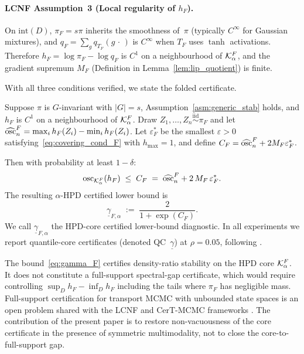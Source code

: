 \paragraph{LCNF Assumption~3 (Local regularity of $h_F$).}
On $\mathrm{int}(D)$, $\pi_F = s\pi$ inherits the smoothness
of~$\pi$ (typically $C^\infty$ for Gaussian mixtures), and
$q_F = \sum_g q_{T_F}(g\,\cdot\,)$ is $C^\infty$ when $T_F$
uses $\tanh$ activations.  Therefore $h_F = \log\pi_F - \log q_F$
is $C^1$ on a neighbourhood of $\mathcal{K}_\alpha^F$, and the gradient
supremum $M_F$ (Definition in Lemma~\ref{lem:lip_quotient}) is
finite.

\medskip
With all three conditions verified, we state the folded certificate.

\begin{theorem}\label{thm:folded_cert}
  Suppose $\pi$ is $G$-invariant with $|G| = s$,
  Assumption~\ref{asm:generic_stab} holds, and $h_F$ is $C^1$ on a
  neighbourhood of $\mathcal{K}_\alpha^F$.
  Draw $Z_1, \ldots, Z_n \overset{\mathrm{iid}}{\sim} \pi_F$ and
  let $\widehat{\mathrm{osc}}_n^F = \max_i h_F(Z_i) - \min_i h_F(Z_i)$.
  Let $\varepsilon_F^*$ be the smallest $\varepsilon > 0$
  satisfying~\eqref{eq:covering_cond_F} with $h_{\max} = 1$, and
  define $C_F = \widehat{\mathrm{osc}}_n^F + 2 M_F \varepsilon_F^*$.

  Then with probability at least $1 - \delta$:
  \begin{equation}\label{eq:osc_bound_F}
    \mathrm{osc}_{\mathcal{K}_\alpha^F}(h_F)
    \;\leq\; C_F
    \;=\; \widehat{\mathrm{osc}}_n^F + 2\,M_F\,\varepsilon_F^*.
  \end{equation}
  The resulting $\alpha$-HPD certified lower bound is
  \begin{equation}\label{eq:gamma_F}
    \underline{\gamma}_{F,\alpha}
    \;:=\; \frac{2}{1 + \exp(C_F)}.
  \end{equation}
  We call $\underline{\gamma}_{F,\alpha}$ the HPD-core certified
  lower-bound diagnostic.
  In all experiments we report quantile-core certificates
  (denoted QC~$\underline{\gamma}$) at $\rho = 0.05$, following
  \citet{CerTMCMC}.
\end{theorem}

\begin{remark}\label{rem:scope}
  The bound~\eqref{eq:gamma_F} certifies density-ratio stability
  on the HPD core $\mathcal{K}_\alpha^F$.  It does not constitute a
  full-support spectral-gap certificate, which would require
  controlling $\sup_D h_F - \inf_D h_F$ including the tails where
  $\pi_F$ has negligible mass.  Full-support certification for
  transport MCMC with unbounded state spaces is an open problem
  shared with the LCNF and CerT-MCMC frameworks
  \citep{LCNF,CerTMCMC}.  The contribution of the present paper is
  to restore non-vacuousness of the core certificate in the
  presence of symmetric multimodality, not to close the
  core-to-full-support gap.
\end{remark}

